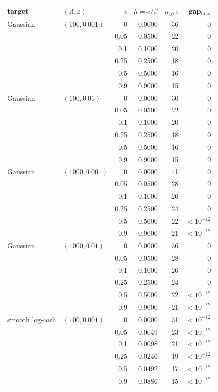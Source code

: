 \begin{tabular}{llrrrr}
\toprule
target & $(\Lambda,\varepsilon)$ & $c$ & $h=c/\beta$ & $n_{10^{-3}}$ & gap$_{\mathrm{final}}$ \\
\midrule
Gaussian & $(100,0.001)$ & 0 & 0.0000 & 36 & 0 \\
 &  & 0.05 & 0.0500 & 22 & 0 \\
 &  & 0.1 & 0.1000 & 20 & 0 \\
 &  & 0.25 & 0.2500 & 18 & 0 \\
 &  & 0.5 & 0.5000 & 16 & 0 \\
 &  & 0.9 & 0.9000 & 15 & 0 \\
\midrule
Gaussian & $(100,0.01)$ & 0 & 0.0000 & 30 & 0 \\
 &  & 0.05 & 0.0500 & 22 & 0 \\
 &  & 0.1 & 0.1000 & 20 & 0 \\
 &  & 0.25 & 0.2500 & 18 & 0 \\
 &  & 0.5 & 0.5000 & 16 & 0 \\
 &  & 0.9 & 0.9000 & 15 & 0 \\
\midrule
Gaussian & $(1000,0.001)$ & 0 & 0.0000 & 41 & 0 \\
 &  & 0.05 & 0.0500 & 28 & 0 \\
 &  & 0.1 & 0.1000 & 26 & 0 \\
 &  & 0.25 & 0.2500 & 24 & 0 \\
 &  & 0.5 & 0.5000 & 22 & $<\!10^{-12}$ \\
 &  & 0.9 & 0.9000 & 21 & $<\!10^{-12}$ \\
\midrule
Gaussian & $(1000,0.01)$ & 0 & 0.0000 & 36 & 0 \\
 &  & 0.05 & 0.0500 & 28 & 0 \\
 &  & 0.1 & 0.1000 & 26 & 0 \\
 &  & 0.25 & 0.2500 & 24 & 0 \\
 &  & 0.5 & 0.5000 & 22 & $<\!10^{-12}$ \\
 &  & 0.9 & 0.9000 & 21 & $<\!10^{-12}$ \\
\midrule
smooth log-cosh & $(100,0.001)$ & 0 & 0.0000 & 31 & $<\!10^{-12}$ \\
 &  & 0.05 & 0.0049 & 23 & $<\!10^{-12}$ \\
 &  & 0.1 & 0.0098 & 21 & $<\!10^{-12}$ \\
 &  & 0.25 & 0.0246 & 19 & $<\!10^{-12}$ \\
 &  & 0.5 & 0.0492 & 17 & $<\!10^{-12}$ \\
 &  & 0.9 & 0.0886 & 15 & $<\!10^{-12}$ \\

\end{tabular}
